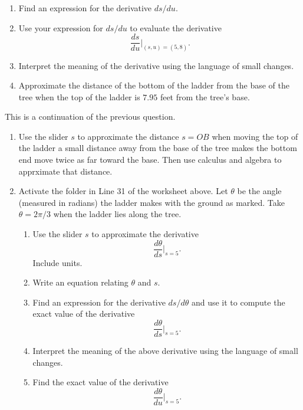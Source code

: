 \documentclass{ximera}
\begin{document}
\begin{question}
\begin{enumerate}
\item Find an expression for the derivative $ds/du$.

\item Use your expression for $ds/du$ to evaluate the derivative
\[
\frac{ds}{du}\Big|_{(s,u) = (5,8)} .
\]

\item Interpret the meaning of the derivative using the language of small changes.

\item Approximate the distance of the bottom of the ladder from the base of the tree when the top of the ladder is $7.95$ feet from the tree's base.

\end{enumerate}

\end{question}





\begin{question} \label{QODFerdfsdf}
This is a continuation of the previous question.

\begin{enumerate}

\item Use the slider $s$ to approximate the distance $s=OB$ when moving the top of the ladder a small distance away from the base of the tree makes the bottom end move twice as far toward the base. Then use calculus and algebra to apprximate that distance.

\item Activate the folder in Line 31 of the worksheet above.  Let $\theta$ be the angle (measured in radians) the ladder makes with the ground as marked. Take $\theta=2\pi/3$ when the ladder lies along the tree.

\begin{enumerate}
\item Use the slider $s$ to approximate the derivative 
\[
\frac{d\theta}{ds}\Big|_{s=5} .
\]
Include units.

\item Write an equation relating $\theta$ and $s$.

\item Find an expression for the derivative $ds/d\theta$ and use it to compute the exact value of the derivative
\[
\frac{d\theta}{ds}\Big|_{s=5} .
\]

\item Interpret the meaning of the above derivative using the language of small changes.

\item Find the exact value of the derivative
\[
\frac{d\theta}{du}\Big|_{s=5}.
\]

\end{enumerate}



\end{enumerate}

\end{question}
\end{document}
